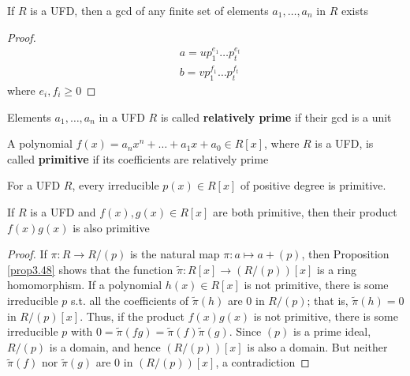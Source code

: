 \documentclass[11pt]{article}
\begin{document}
\begin{proposition}[]
If \(R\) is a UFD, then a gcd of any finite set of elements \(a_1,\dots, a_n\)
in \(R\) exists
\end{proposition}

\begin{proof}
\begin{align*}
&a=up_1^{e_1}\dots p_t^{e_t}\\
&b=vp_1^{f_1}\dots p_t^{f_t}
\end{align*}
where \(e_i,f_i\ge0\)
\end{proof}

\begin{definition}[]
Elements \(a_1,\dots,a_n\) in a UFD \(R\) is called \textbf{relatively prime} if their
gcd is a unit
\end{definition}

\begin{definition}[]
A polynomial \(f(x)=a_nx^n+\dots+a_1x+a_0\in R[x]\), where \(R\) is a UFD, is
called \textbf{primitive} if its coefficients are relatively prime
\end{definition}

\begin{examplle}[]
For a UFD \(R\), every irreducible \(p(x)\in R[x]\) of positive degree is
primitive. 
\end{examplle}

\begin{lemma}
If \(R\) is a UFD and \(f(x),g(x)\in R[x]\) are both primitive, then their
product \(f(x)g(x)\) is also primitive
\end{lemma}

\begin{proof}
If \(\pi:R\to R/(p)\) is the natural map \(\pi:a\mapsto a+(p)\), then Proposition
\ref{prop3.48} shows that the function \(\widetilde{\pi}:R[x]\to(R/(p))[x]\) is a
ring homomorphism. If a polynomial \(h(x)\in R[x]\) is not primitive, there is
some irreducible \(p\) s.t. all the coefficients of \(\widetilde{\pi}(h)\) are 0
in \(R/(p)\); that is, \(\widetilde{\pi}(h)=0\) in \(R/(p)[x]\). Thus, if the
product \(f(x)g(x)\) is not primitive, there is some irreducible \(p\) with 
\(0=\widetilde{\pi}(fg)=\widetilde{\pi}(f)\widetilde{\pi}(g)\). Since \((p)\) is a
prime ideal, \(R/(p)\) is a domain, and hence \((R/(p))[x]\) is also a
domain. But neither \(\widetilde{\pi}(f)\) nor \(\widetilde{\pi}(g)\) are 0 in
\((R/(p))[x]\), a contradiction
\end{proof}
\end{document}
